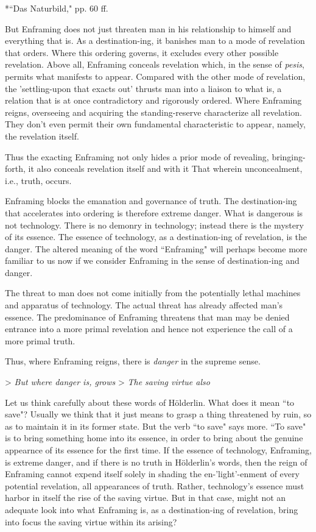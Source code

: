 \documentclass[12pt]{article}
\begin{document}
*``Das Naturbild," pp. 60 ff.

But Enframing does not just threaten man in his relationship to himself and everything that is. As a destination-ing, it banishes man to a mode of revelation that orders. Where this ordering governs, it excludes every other possible revelation. Above all, Enframing conceals revelation which, in the sense of \textit{pesis}, permits what manifests to appear. Compared with the other mode of revelation, the 'settling-upon that exacts out' thrusts man into a liaison to what is, a relation that is at once contradictory and rigorously ordered. Where Enframing reigns, overseeing and acquiring the standing-reserve characterize all revelation. They don't even permit their own fundamental characteristic to appear, namely, the revelation itself.

Thus the exacting Enframing not only hides a prior mode of revealing, bringing-forth, it also conceals revelation itself and with it That wherein unconcealment, i.e., truth, occurs.

Enframing blocks the emanation and governance of truth. The destination-ing that accelerates into ordering is therefore extreme danger. What is dangerous is not technology. There is no demonry in technology; instead there is the mystery of its essence. The essence of technology, as a destination-ing of revelation, is the danger. The altered meaning of the word ``Enframing" will perhaps become more familiar to us now if we consider Enframing in the sense of destination-ing and danger.

The threat to man does not come initially from the potentially lethal machines and apparatus of technology. The actual threat has already affected man's essence. The predominance of Enframing threatens that man may be denied entrance into a more primal revelation and hence not experience the call of a more primal truth.

Thus, where Enframing reigns, there is \textit{danger} in the supreme sense.

> \textit{But where danger is, grows}
> \textit{The saving virtue also}

Let us think carefully about these words of H\"{o}lderlin. What does it mean ``to save"? Usually we think that it just means to grasp a thing threatened by ruin, so as to maintain it in its former state. But the verb ``to save" says more. ``To save" is to bring something home into its essence, in order to bring about the genuine appearnce of its essence for the first time. If the essence of technology, Enframing, is extreme danger, and if there is no truth in H\"{o}lderlin's words, then the reign of Enframing cannot expend itself solely in shading the en-'light'-enment of every potential revelation, all appearances of truth. Rather, technology's essence must harbor in itself the rise of the saving virtue. But in that case, might not an adequate look into what Enframing is, as a destination-ing of revelation, bring into focus the saving virtue within its arising? 
\end{document}
